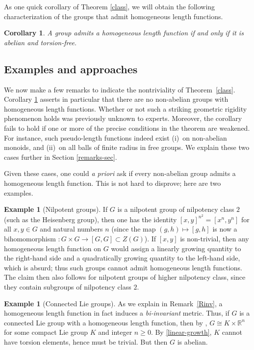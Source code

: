 \documentclass[11pt,a4paper,reqno]{amsart}
\numberwithin{equation}{section}
\theoremstyle{plain}
\newtheorem{corollary}[equation]{Corollary}
\theoremstyle{definition}
\newtheorem{example}[equation]{Example}
\newcommand\R{\mathbb{R}}
\begin{document}
As one quick corollary of Theorem \ref{class}, we will obtain the
following characterization of the groups that admit
homogeneous length functions.

\begin{corollary}\label{abel}
A group admits a homogeneous length function if and only if it is
abelian and torsion-free.
\end{corollary}


\subsection{Examples and approaches}

We now make a few remarks to indicate the nontriviality of
Theorem~\ref{class}. Corollary \ref{abel} asserts in particular that
there are no non-abelian groups with homogeneous length functions.
Whether or not such a striking geometric rigidity phenomenon holds was
previously unknown to experts. Moreover, the corollary fails
to hold if one or more of the precise conditions in the theorem are
weakened. For instance, such pseudo-length functions indeed exist (i)~on
non-abelian monoids, and (ii)~on all balls of finite radius in free
groups. We explain these two cases further in Section \ref{remarks-sec}.

Given these cases, one could \textit{a priori} ask if every non-abelian
group admits a homogeneous length function. This is not hard to
disprove; here are two examples.

\begin{example}[Nilpotent groups]
If $G$ is a nilpotent group of nilpotency class $2$ (such as the
Heisenberg group), then one has the identity $[x,y]^{n^2} = [x^n,y^n]$
for all $x,y \in G$ and natural numbers $n$ (since the map $(g,h) \mapsto
[g,h]$ is now a bihomomorphism $: G \times G \to [G,G] \subset Z(G)$).
If $[x,y]$ is non-trivial, then any homogeneous length function on $G$
would assign a linearly growing quantity to the right-hand side and a
quadratically growing quantity to the left-hand side, which is absurd;
thus such groups cannot admit homogeneous length functions.  The claim
then also follows for nilpotent groups of higher nilpotency class, since
they contain subgroups of nilpotency class $2$.
\end{example}


\begin{example}[Connected Lie groups]
As we explain in Remark~\ref{Rinv}, a homogeneous length function in fact
induces a \textit{bi-invariant} metric. Thus, if $G$ is a connected Lie
group with a homogeneous length function, then by \cite[Lemma
7.5]{Milnor}, $G \cong K \times \R^n$ for some compact Lie group $K$ and
integer $n \geq 0$. By \eqref{linear-growth}, $K$ cannot have torsion
elements, hence must be trivial. But then $G$ is abelian.
\end{example}
\end{document}
